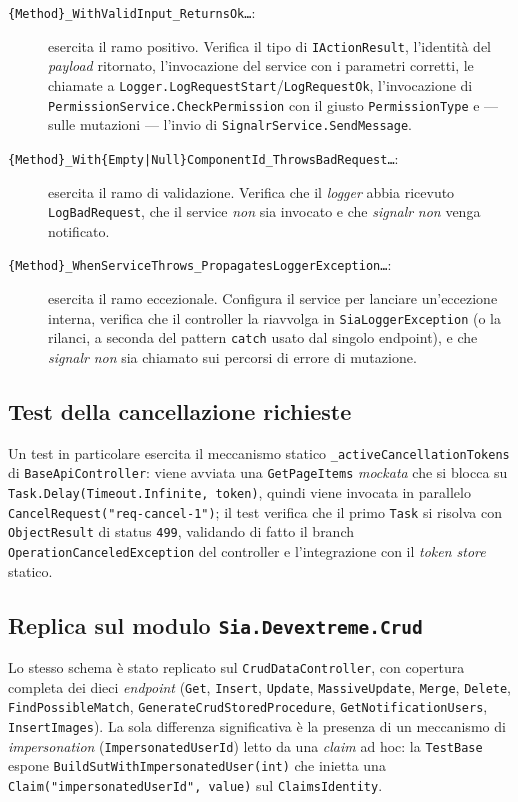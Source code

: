 \begin{description}
    \item[\texttt{\{Method\}\_WithValidInput\_ReturnsOk\dots}:] esercita il ramo positivo. Verifica il tipo di \texttt{IActionResult}, l'identità del \emph{payload} ritornato, l'invocazione del service con i parametri corretti, le chiamate a \texttt{Logger.LogRequestStart}/\texttt{LogRequestOk}, l'invocazione di \texttt{PermissionService.CheckPermission} con il giusto \texttt{PermissionType} e — sulle mutazioni — l'invio di \texttt{SignalrService.SendMessage}.
    \item[\texttt{\{Method\}\_With\{Empty|Null\}ComponentId\_ThrowsBadRequest\dots}:] esercita il ramo di validazione. Verifica che il \emph{logger} abbia ricevuto \texttt{LogBadRequest}, che il service \emph{non} sia invocato e che \emph{signalr} \emph{non} venga notificato.
    \item[\texttt{\{Method\}\_WhenServiceThrows\_PropagatesLoggerException\dots}:] esercita il ramo eccezionale. Configura il service per lanciare un'eccezione interna, verifica che il controller la riavvolga in \texttt{SiaLoggerException} (o la rilanci, a seconda del pattern \texttt{catch} usato dal singolo endpoint), e che \emph{signalr} \emph{non} sia chiamato sui percorsi di errore di mutazione.
\end{description}

\subsection{Test della cancellazione richieste}

Un test in particolare esercita il meccanismo statico \texttt{\_activeCancellationTokens} di \texttt{BaseApiController}: viene avviata una \texttt{GetPageItems} \emph{mockata} che si blocca su \texttt{Task.Delay(Timeout.Infinite, token)}, quindi viene invocata in parallelo \texttt{CancelRequest("req-cancel-1")}; il test verifica che il primo \texttt{Task} si risolva con \texttt{ObjectResult} di status \texttt{499}, validando di fatto il branch \texttt{OperationCanceledException} del controller e l'integrazione con il \emph{token store} statico.

\subsection{Replica sul modulo \texttt{Sia.Devextreme.Crud}}

Lo stesso schema è stato replicato sul \texttt{CrudDataController}, con copertura completa dei dieci \emph{endpoint} (\texttt{Get}, \texttt{Insert}, \texttt{Update}, \texttt{MassiveUpdate}, \texttt{Merge}, \texttt{Delete}, \texttt{FindPossibleMatch}, \texttt{GenerateCrudStoredProcedure}, \texttt{GetNotificationUsers}, \texttt{InsertImages}). La sola differenza significativa è la presenza di un meccanismo di \emph{impersonation} (\texttt{ImpersonatedUserId}) letto da una \emph{claim} ad hoc: la \texttt{TestBase} espone \texttt{BuildSutWithImpersonatedUser(int)} che inietta una \texttt{Claim("impersonatedUserId", value)} sul \texttt{ClaimsIdentity}.

